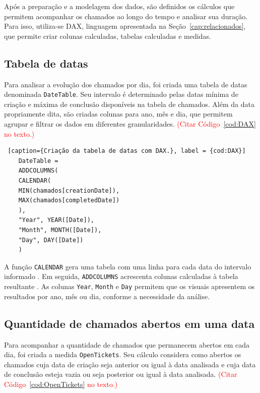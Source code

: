 Após a preparação e a modelagem dos dados, são definidos os cálculos que permitem acompanhar os chamados ao longo do tempo e analisar sua duração. Para isso, utiliza-se DAX, linguagem apresentada na Seção~\ref{cap:relacionados}, que permite criar colunas calculadas, tabelas calculadas e medidas.

\subsection{Tabela de datas}

Para analisar a evolução dos chamados por dia, foi criada uma tabela de datas denominada \texttt{DateTable}. Seu intervalo é determinado pelas datas mínima de criação e máxima de conclusão disponíveis na tabela de chamados. Além da data propriamente dita, são criadas colunas para ano, mês e dia, que permitem agrupar e filtrar os dados em diferentes granularidades. \textcolor{red}{(Citar Código~\ref{cod:DAX} no texto.)}\\

\begin{lstlisting} [caption={Criação da tabela de datas com DAX.}, label = {cod:DAX}]
	DateTable =
	ADDCOLUMNS(
	CALENDAR(
	MIN(chamados[creationDate]),
	MAX(chamados[completedDate])
	),
	"Year", YEAR([Date]),
	"Month", MONTH([Date]),
	"Day", DAY([Date])
	)
\end{lstlisting}



A função \texttt{CALENDAR} gera uma tabela com uma linha para cada data do intervalo informado \cite{DAX_CALENDAR}. Em seguida, \texttt{ADDCOLUMNS} acrescenta colunas calculadas à tabela resultante \cite{DAX_ADDCOLUMNS}. As colunas \texttt{Year}, \texttt{Month} e \texttt{Day} permitem que os visuais apresentem os resultados por ano, mês ou dia, conforme a necessidade da análise.


\subsection{Quantidade de chamados abertos em uma data}


Para acompanhar a quantidade de chamados que permanecem abertos em cada dia, foi criada a medida \texttt{OpenTickets}. Seu cálculo considera como abertos os chamados cuja data de criação seja anterior ou igual à data analisada e cuja data de conclusão esteja vazia ou seja posterior ou igual à data analisada.  \textcolor{red}{(Citar Código~\ref{cod:OpenTickets} no texto.)}\\

